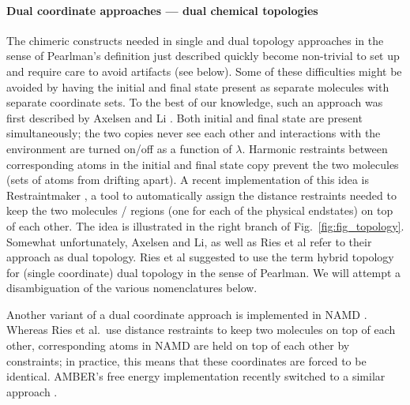 \documentclass[9pt,bestpractices,pubversion]{livecoms}
\newcommand{\sbnote}[1]{%
  {\bfseries{}[SB: }%
  {\textcolor{blue}{#1}}{\bfseries{}]}
  }
\begin{document}
\paragraph{Dual coordinate approaches --- dual chemical topologies}

The chimeric constructs needed in single and dual topology approaches in the sense of Pearlman’s definition just described quickly become non-trivial to set up and require care to avoid artifacts (see below). %
Some of these difficulties might be avoided by having the initial and final state present as separate molecules with separate coordinate sets. To the best of our knowledge, such an approach was first described by Axelsen and Li \cite{Axelsen_1998}. Both initial and final state are present simultaneously; the two copies never see each other and interactions with the environment are turned on/off as a function of $\lambda$. Harmonic restraints between corresponding atoms in the initial and final state copy prevent the two molecules (sets of atoms from drifting apart). %
A recent implementation of this idea is Restraintmaker \cite{Ries_2022}, a tool to automatically assign the distance restraints needed to keep the two molecules / regions (one for each of the physical endstates) on top of each other. The idea is illustrated in the right branch of Fig.~\ref{fig:fig_topology}.  Somewhat unfortunately, Axelsen and Li, as well as Ries et al refer to their approach as dual topology. Ries et al suggested to use the term hybrid topology for (single coordinate) dual topology in the sense of Pearlman. We will attempt a disambiguation of the various nomenclatures below.

Another variant of a dual coordinate approach is implemented in NAMD \cite{jiang2019computing}. Whereas Ries et al.\  use distance restraints to keep two molecules on top of each other, corresponding atoms in NAMD are held on top of each other by constraints; in practice, this means that these coordinates are forced to be identical. AMBER's free energy implementation recently switched to a similar approach \cite{Lee_2023}.
\end{document}

